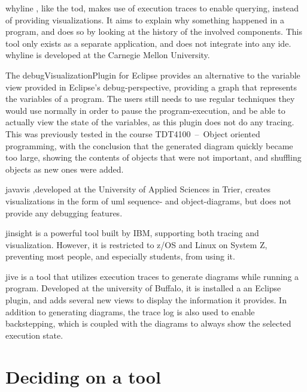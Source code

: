 \Gls{whyline} \cite{ko2009}, like the \gls{tod}, makes use of execution traces to enable querying, instead of providing visualizations.
It aims to explain why something happened in a program, and does so by looking at the history of the involved components.
This tool only exists as a separate application, and does not integrate into any \gls{ide}.
\Gls{whyline} is developed at the Carnegie Mellon University.

The \gls{debugVisualizationPlugin} for Eclipse provides an alternative to the variable view provided in Eclipse's debug-perspective, providing a graph that represents the variables of a program.
The users still needs to use regular techniques they would use normally in order to pause the program-execution, and be able to actually view the state of the variables, as this plugin does not do any tracing.
This was previously tested in the course TDT4100~--~Object oriented programming, with the conclusion that the generated diagram quickly became too large, showing the contents of objects that were not important, and shuffling objects as new ones were added.%

\Gls{javavis} \cite{Oechsle2002},developed at the University of Applied Sciences in Trier, creates visualizations in the form of \gls{uml} sequence- and object-diagrams, but does not provide any debugging features.

\Gls{jinsight} \cite{Pauw} is a powerful tool built by IBM, supporting both tracing and visualization.
However, it is restricted to z/OS and Linux on System Z, preventing most people, and especially students, from using it.

\gls{jive} is a tool that utilizes execution traces to generate diagrams while running a program.
Developed at the university of Buffalo, it is installed a an Eclipse plugin, and adds several new views to display the information it provides.
In addition to generating diagrams, the trace log is also used to enable backstepping, which is coupled with the diagrams to always show the selected execution state.

\section{Deciding on a tool}\label{preDiscuss}

